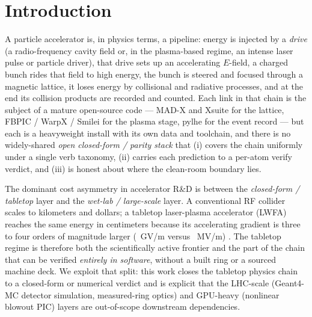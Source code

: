 \documentclass[11pt,a4paper]{article}
\begin{document}
\section{Introduction}
\label{sec:intro}

A particle accelerator is, in physics terms, a pipeline: energy is
injected by a \emph{drive} (a radio-frequency cavity field or, in the
plasma-based regime, an intense laser pulse or particle driver), that
drive sets up an accelerating $E$-field, a charged bunch rides that field
to high energy, the bunch is steered and focused through a magnetic
lattice, it loses energy by collisional and radiative processes, and at
the end its collision products are recorded and counted. Each link in
that chain is the subject of a mature open-source code --- MAD-X and
Xsuite for the lattice, FBPIC / WarpX / Smilei for the plasma stage,
pylhe for the event record --- but each is a heavyweight install with its
own data and toolchain, and there is no widely-shared \emph{open
closed-form / parity stack} that (i) covers the chain uniformly under a
single verb taxonomy, (ii) carries each prediction to a per-atom verify
verdict, and (iii) is honest about where the clean-room boundary lies.

The dominant cost asymmetry in accelerator R\&D is between the
\emph{closed-form / tabletop} layer and the \emph{wet-lab / large-scale}
layer. A conventional RF collider scales to kilometers and dollars;
a tabletop laser-plasma accelerator (LWFA) reaches the same energy in
centimeters because its accelerating gradient is three to four orders of
magnitude larger (\SI{}{GV/m} versus \SI{}{MV/m})
\citep{esarey2009lpa,tajima1979}. The tabletop regime is therefore both
the scientifically active frontier and the part of the chain that can be
verified \emph{entirely in software}, without a built ring or a sourced
machine deck. We exploit that split: this work closes the tabletop
physics chain to a closed-form or numerical verdict and is explicit that
the LHC-scale (Geant4-MC detector simulation, measured-ring optics) and
GPU-heavy (nonlinear blowout PIC) layers are out-of-scope downstream
dependencies.
\end{document}
